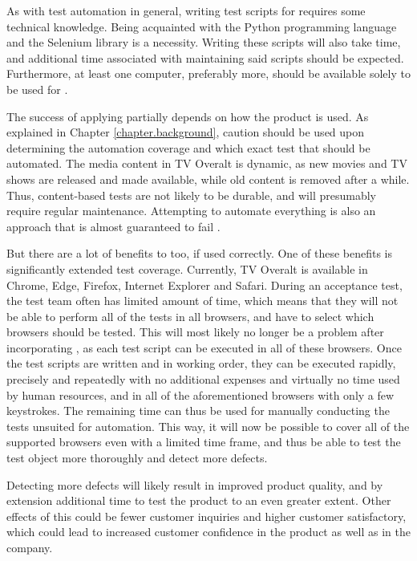 As with test automation in general, writing test scripts for \toolname \space requires some technical knowledge. Being acquainted with the Python programming language and the Selenium library is a necessity. Writing these scripts will also take time, and additional time associated with maintaining said scripts should be expected. Furthermore, at least one computer, preferably more, should be available solely to be used for \toolname.

The success of applying \toolname \space partially depends on how the product is used. As explained in Chapter \ref{chapter.background}, caution should be used upon determining the automation coverage and which exact test that should be automated. The media content in TV Overalt is dynamic, as new movies and TV shows are released and made available, while old content is removed after a while. Thus, content-based tests are not likely to be durable, and will presumably require regular maintenance. Attempting to automate everything is also an approach that is almost guaranteed to fail \cite{ksljdf}.

But there are a lot of benefits to \toolname \space too, if used correctly. One of these benefits is significantly extended test coverage. Currently, TV Overalt is available in Chrome, Edge, Firefox, Internet Explorer and Safari. During an acceptance test, the test team often has limited amount of time, which means that they will not be able to perform all of the tests in all browsers, and have to select which browsers should be tested. This will most likely no longer be a problem after incorporating \toolname, as each test script can be executed in all of these browsers. Once the test scripts are written and in working order, they can be executed rapidly, precisely and repeatedly with no additional expenses and virtually no time used by human resources, and in  all of the aforementioned browsers with only a few keystrokes. The remaining time can thus be used for manually conducting the tests unsuited for automation. This way, it will now be possible to cover all of the supported browsers even with a limited time frame, and thus be able to test the test object more thoroughly and detect more defects.

Detecting more defects will likely result in improved product quality, and by extension additional time to test the product to an even greater extent. Other effects of this could be fewer customer inquiries and higher customer satisfactory, which could lead to increased customer confidence in the product as well as in the company.

